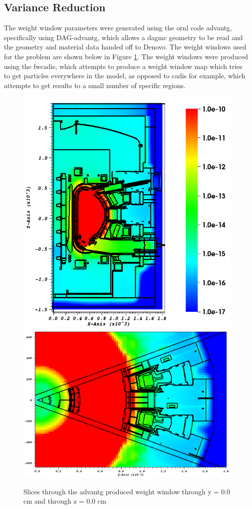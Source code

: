 \documentclass[12pt]{article}
\begin{document}
\subsection{Variance Reduction}
The weight window parameters were generated using the \gls{ornl} code
\gls{advantg}, specifically using DAG-\gls{advantg}, which allows a
\gls{dagmc} geometry to be read and the geometry and material data handed off to
Denovo. The weight windows used for the problem are shown below in Figure
\ref{fig:wwinp}. The weight windows were produced using the \gls{fwcadis},
which attempts to produce a weight window map which tries to get particles
everywhere in the model, as opposed to \gls{cadis} for example, which
attempts to get results to a small number of specific regions.
\begin{figure}[ht!]
  \centering
  \includegraphics[scale=0.4]{../plots/wwinp/wwinp_y0.png}
  \includegraphics[scale=0.3]{../plots/wwinp/wwinp_z0.png}
  \caption{Slices through the \gls{advantg} produced weight window through y =
  0.0 cm and through z = 0.0 cm}
  \label{fig:wwinp}
\end{figure}
\end{document}

